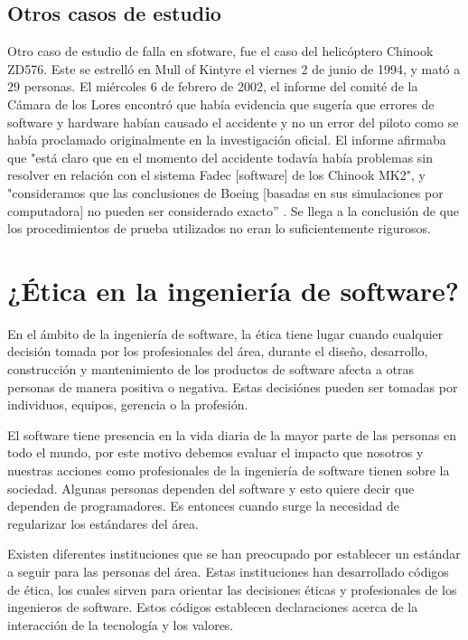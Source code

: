 \documentclass[twoside]{article}
\begin{document}
\begin{multicols}{2}
\subsection{Otros casos de estudio}

Otro caso de estudio de falla en sfotware, fue el caso del helicóptero Chinook
ZD576. Este se estrelló en Mull of Kintyre el viernes 2 de junio de 1994,  y
mató a 29 personas. El miércoles 6 de febrero de 2002, el informe del comité de
la Cámara de los Lores encontró que había evidencia que sugería que errores de
software y hardware habían causado el accidente y no un error del piloto como se
había proclamado originalmente en la investigación oficial. El informe afirmaba
que "está claro que en el momento del accidente todavía había problemas sin
resolver en relación con el sistema Fadec [software] de los Chinook MK2", y
"consideramos que las conclusiones de Boeing [basadas en sus simulaciones por
computadora] no pueden ser considerado exacto” \cite{collins2002software}. Se
llega a la conclusión de que los procedimientos de prueba utilizados no eran lo
suficientemente rigurosos.


\section{¿Ética en la ingeniería de software?}

En el ámbito de la ingeniería de software, la ética tiene lugar cuando cualquier
decisión tomada por los profesionales del área, durante el diseño, desarrollo,
construcción y mantenimiento de los productos de software afecta a otras
personas de manera positiva o negativa. Estas decisiónes pueden ser tomadas por
individuos, equipos, gerencia o la profesión.

El software tiene presencia en la vida diaria de la mayor parte de las personas
en todo el mundo, por este motivo debemos evaluar el impacto que nosotros y
nuestras acciones como profesionales de la ingeniería de software tienen sobre
la sociedad. Algunas personas dependen del software y esto quiere decir que
dependen de programadores. Es entonces cuando surge la necesidad de regularizar
los estándares del área.

Existen diferentes instituciones que se han preocupado por establecer un
estándar a seguir para las personas del área. Estas instituciones han
desarrollado códigos de ética, los cuales sirven para orientar las decisiones
éticas y profesionales de los ingenieros de software. Estos códigos establecen
declaraciones acerca de la interacción de la tecnología y los valores.


\end{multicols}
\end{document}
